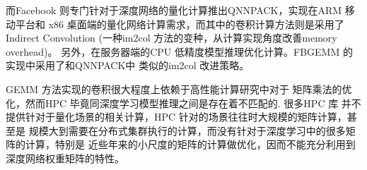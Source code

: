 而Facebook 则专门针对于深度网络的量化计算推出QNNPACK，实现在ARM 移动平台和
x86 桌面端的量化网络计算需求，而其中的卷积计算方法则是采用了 Indirect Convolution
\cite{Dukhan2019TheIC}(一种im2col 方法的变种，从计算实现角度改善memory overhead)。
另外，在服务器端的CPU 低精度模型推理优化计算。FBGEMM 的实现中采用了和QNNPACK中
类似的im2col 改进策略。

GEMM 方法实现的卷积很大程度上依赖于高性能计算研究中对于
矩阵乘法的优化，然而HPC 毕竟同深度学习模型推理之间是存在着不匹配的. 很多HPC 库
并不提供针对于量化场景的相关计算，HPC 针对的场景往往时大规模的矩阵计算，甚至是
规模大到需要在分布式集群执行的计算，而没有针对于深度学习中的很多矩阵的计算，特别是
近些年来的小尺度的矩阵的计算做优化，因而不能充分利用到深度网络权重矩阵的特性。

